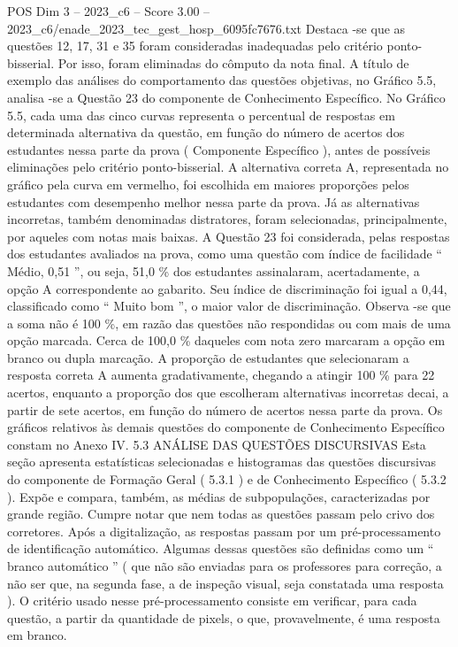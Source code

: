 \begin{textsample}{POS Dim 3 – 2023\_c6 – Score 3.00 – 2023\_c6/enade\_2023\_tec\_gest\_hosp\_6095fc7676.txt}
Destaca -se que as questões 12, 17, 31 e 35 foram consideradas inadequadas pelo critério ponto-bisserial.
Por isso, foram eliminadas do cômputo da nota final.
A título de exemplo das análises do comportamento das questões objetivas, no Gráfico 5.5, analisa -se a Questão 23 do componente de Conhecimento Específico.
No Gráfico 5.5, cada uma das cinco curvas representa o percentual de respostas em determinada alternativa da questão, em função do número de acertos dos estudantes nessa parte da prova ( Componente Específico ), antes de possíveis eliminações pelo critério ponto-bisserial.
A alternativa correta A, representada no gráfico pela curva em vermelho, foi escolhida em maiores proporções pelos estudantes com desempenho melhor nessa parte da prova.
Já as alternativas incorretas, também denominadas distratores, foram selecionadas, principalmente, por aqueles com notas mais baixas.
A Questão 23 foi considerada, pelas respostas dos estudantes avaliados na prova, como uma questão com índice de facilidade “ Médio, 0,51 ”, ou seja, 51,0 \% dos estudantes assinalaram, acertadamente, a opção A correspondente ao gabarito.
Seu índice de discriminação foi igual a 0,44, classificado como “ Muito bom ”, o maior valor de discriminação.
Observa -se que a soma não é 100 \%, em razão das questões não respondidas ou com mais de uma opção marcada.
Cerca de 100,0 \% daqueles com nota zero marcaram a opção em branco ou dupla marcação.
A proporção de estudantes que selecionaram a resposta correta A aumenta gradativamente, chegando a atingir 100 \% para 22 acertos, enquanto a proporção dos que escolheram alternativas incorretas decai, a partir de sete acertos, em função do número de acertos nessa parte da prova.
Os gráficos relativos às demais questões do componente de Conhecimento Específico constam no Anexo IV. 5.3 ANÁLISE DAS QUESTÕES DISCURSIVAS Esta seção apresenta estatísticas selecionadas e histogramas das questões discursivas do componente de Formação Geral ( 5.3.1 ) e de Conhecimento Específico ( 5.3.2 ).
Expõe e compara, também, as médias de subpopulações, caracterizadas por grande região.
Cumpre notar que nem todas as questões passam pelo crivo dos corretores.
Após a digitalização, as respostas passam por um pré-processamento de identificação automático.
Algumas dessas questões são definidas como um “ branco automático ” ( que não são enviadas para os professores para correção, a não ser que, na segunda fase, a de inspeção visual, seja constatada uma resposta ).
O critério usado nesse pré-processamento consiste em verificar, para cada questão, a partir da quantidade de pixels, o que, provavelmente, é uma resposta em branco.

\end{textsample}

